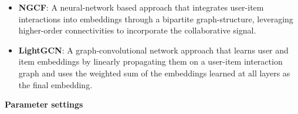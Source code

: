 \begin{itemize}
    \item \textbf{NGCF\cite{NGCF}}: A neural-network based approach that integrates user-item interactions into embeddings through a bipartite graph-structure, leveraging higher-order connectivities to incorporate the collaborative signal.
    \item \textbf{LightGCN\cite{LightGCN}}: A graph-convolutional network approach that learns user and item embeddings by linearly propagating them on a user-item interaction graph and uses the weighted sum of the embeddings learned at all layers as the final embedding.
\end{itemize}
\textbf{Parameter settings}\\
